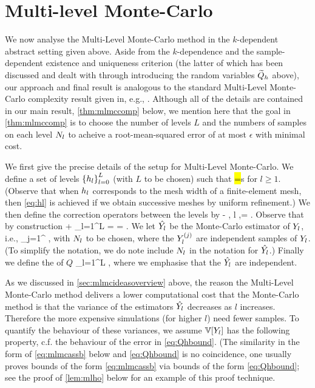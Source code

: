 \section{Multi-level Monte-Carlo}\label{sec:mlmcan}
We now analyse the Multi-Level Monte-Carlo method in the $k$-dependent abstract setting given above. Aside from the $k$-dependence and the sample-dependent existence and uniqueness criterion (the latter of which has been discussed and dealt with through introducing the random variables $\widetilde{Q}_{h}$ above), our approach and final result is analogous to the standard Multi-Level Monte-Carlo complexity result given in, e.g., \cite[Theorem 1]{ClGiScTe:11}. Although all of the details are contained in our main result, \cref{thm:mlmccomp} below, we mention here that the goal in \cref{thm:mlmccomp} is to choose the number of levels $L$ and the numbers of samples on each level $N_{l}$ to acheive a root-mean-squared error of at most $\epsilon$ with minimal cost.

We first give the precise details of the setup for Multi-Level Monte-Carlo. We define a set of levels $\set{\hl}_{l=0}^L$ (with $L$ to be chosen) such that
\beq\label{eq:hl}
\hl =\frac{\hlmo}s
\eeq
for $l \geq 1$. (Observe that when $h_{l}$ corresponds to the mesh width of a finite-element mesh, then \cref{eq:hl} is achieved if we obtain successive meshes by uniform refinement.) We then define the correction operators between the levels by
\beqs
\Yl \de \Qhltilde - \Qhlmotilde, l ,\quad \Yz = \Qhztilde.
\eeqs
Observe that by construction
\beq\label{eq:expectationtelescope}
\EXP{\Yz} + \sum_{l=1}^L \EXP{\Yl} =  = \EXP{\QhLtilde}.
\eeq
We let $\hat{Y_{l}}$ be the Monte-Carlo estimator of $Y_{l}$, i.e.,
 \beqs
\Ylhat \de {}\sum_{j=1}^{\Nl} \Ylj,
 \eeqs
 with $N_{l}$ to be chosen, where the $Y_{l}^{(j)}$ are independent samples of $Y_{l}$. (To simplify the notation, we do note include $N_{l}$ in the notation for $\hat{Y_{l}}$.) Finally we define the  of $Q$
 \beqs
 \QhatMLhL \de \sum_{l=1}^L \Ylhat,
 \eeqs
 where we emphasise that the $\hat{Y_{l}}$ are independent.

 As we discussed in \cref{sec:mlmcideasoverview} above, the reason the Multi-Level Monte-Carlo method delivers a lower computational cost that the Monte-Carlo method is that the variance of the estimators $\hat{Y_{l}}$ decreases as $l$ increases. Therefore the more expensive simulations (for higher $l$) need fewer samples. To quantify the behaviour of these variances, we assume $\VAR{\Yl}$ has the following property, c.f. the behaviour of the error in \cref{eq:Qhbound}. (The similarity in the form of \cref{eq:mlmcassb} below and \cref{eq:Qhbound} is no coincidence, one usually proves bounds of the form \cref{eq:mlmcassb} via bounds of the form \cref{eq:Qhbound}; see the proof of \cref{lem:mlho} below for an example of this proof technique.

